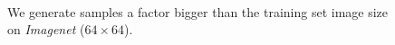 \documentclass{article}
\begin{document}
\begin{figure}[H]
\vspace{0pt}
    \centering {} \\
    \caption{We generate samples a factor bigger than the training set image size on \emph{Imagenet} ($64 \times 64$).}
\vspace{0pt}
\end{figure}
\end{document}
